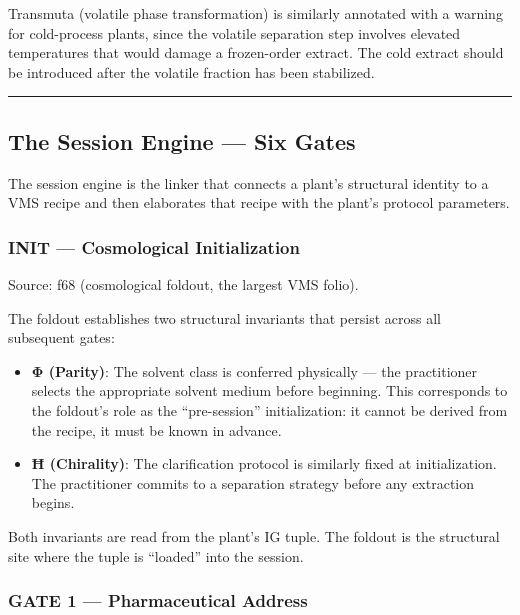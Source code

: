 Transmuta (volatile phase transformation) is similarly annotated with a
warning for cold-process plants, since the volatile separation step
involves elevated temperatures that would damage a frozen-order extract.
The cold extract should be introduced after the volatile fraction has
been stabilized.

\begin{center}\rule{0.5\linewidth}{0.5pt}\end{center}

\hypertarget{the-session-engine-six-gates}{%
\subsection{The Session Engine --- Six
Gates}\label{the-session-engine-six-gates}}

The session engine is the linker that connects a plant's structural
identity to a VMS recipe and then elaborates that recipe with the
plant's protocol parameters.

\hypertarget{init-cosmological-initialization}{%
\subsubsection{INIT --- Cosmological
Initialization}\label{init-cosmological-initialization}}

Source: f68 (cosmological foldout, the largest VMS folio).

The foldout establishes two structural invariants that persist across
all subsequent gates:

\begin{itemize}
\item
  \textbf{Φ (Parity)}: The solvent class is conferred physically --- the
  practitioner selects the appropriate solvent medium before beginning.
  This corresponds to the foldout's role as the ``pre-session''
  initialization: it cannot be derived from the recipe, it must be known
  in advance.
\item
  \textbf{Ħ (Chirality)}: The clarification protocol is similarly fixed
  at initialization. The practitioner commits to a separation strategy
  before any extraction begins.
\end{itemize}

Both invariants are read from the plant's IG tuple. The foldout is the
structural site where the tuple is ``loaded'' into the session.

\hypertarget{gate-1-pharmaceutical-address}{%
\subsubsection{GATE 1 --- Pharmaceutical
Address}\label{gate-1-pharmaceutical-address}}

